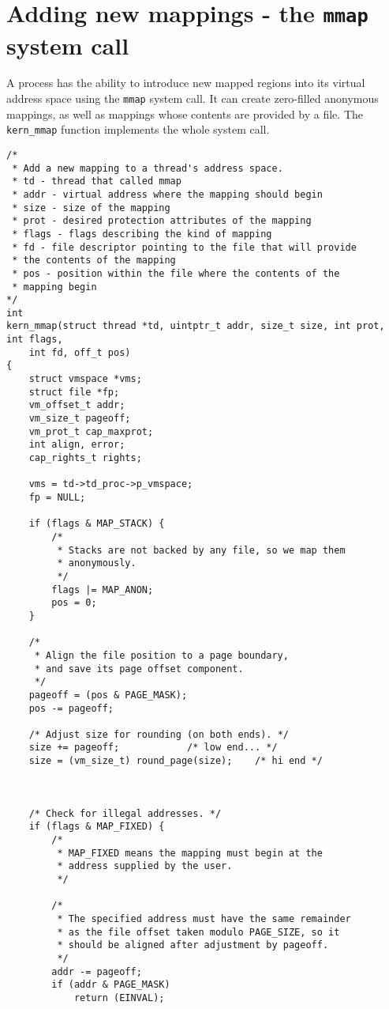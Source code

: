 \documentclass[shortabstract, english]{iithesis}
\newenvironment{code}{}{}
\begin{document}
\section{Adding new mappings - the \texttt{mmap} system call}

A process has the ability to introduce new mapped regions into its virtual
address space using the \texttt{mmap} system call. It can create zero-filled
anonymous mappings, as well as mappings whose contents are provided by a file.
The \texttt{kern_mmap} function implements the whole system call.

\vspace{50pt}

\begin{code}
\begin{verbatim}
/*
 * Add a new mapping to a thread's address space.
 * td - thread that called mmap
 * addr - virtual address where the mapping should begin
 * size - size of the mapping
 * prot - desired protection attributes of the mapping
 * flags - flags describing the kind of mapping
 * fd - file descriptor pointing to the file that will provide
 * the contents of the mapping
 * pos - position within the file where the contents of the
 * mapping begin
*/
int
kern_mmap(struct thread *td, uintptr_t addr, size_t size, int prot, int flags,
    int fd, off_t pos)
{
    struct vmspace *vms;
    struct file *fp;
    vm_offset_t addr;
    vm_size_t pageoff;
    vm_prot_t cap_maxprot;
    int align, error;
    cap_rights_t rights;

    vms = td->td_proc->p_vmspace;
    fp = NULL;

    if (flags & MAP_STACK) {
        /*
         * Stacks are not backed by any file, so we map them
         * anonymously.
         */
        flags |= MAP_ANON;
        pos = 0;
    }

    /*
     * Align the file position to a page boundary,
     * and save its page offset component.
     */
    pageoff = (pos & PAGE_MASK);
    pos -= pageoff;

    /* Adjust size for rounding (on both ends). */
    size += pageoff;            /* low end... */
    size = (vm_size_t) round_page(size);    /* hi end */



    /* Check for illegal addresses. */
    if (flags & MAP_FIXED) {
        /*
         * MAP_FIXED means the mapping must begin at the
         * address supplied by the user.
         */

        /*
         * The specified address must have the same remainder
         * as the file offset taken modulo PAGE_SIZE, so it
         * should be aligned after adjustment by pageoff.
         */
        addr -= pageoff;
        if (addr & PAGE_MASK)
            return (EINVAL);


\end{verbatim}
\end{code}
\end{document}

